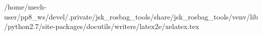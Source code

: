 /home/mech-user/pp8_ws/devel/.private/jsk_rosbag_tools/share/jsk_rosbag_tools/venv/lib/python2.7/site-packages/docutils/writers/latex2e/xelatex.tex